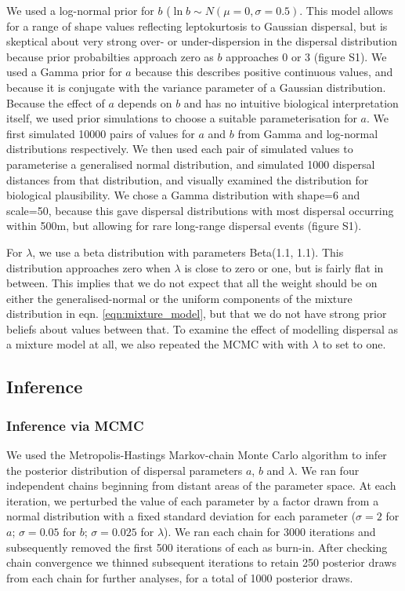 \documentclass[10pt, a4paper, twocolumn]{article} %
\begin{document}
We used a log-normal prior for $b$ ($\ln b \sim N(\mu=0, \sigma = 0.5)$.
This model allows for a range of shape values reflecting leptokurtosis to Gaussian dispersal, but is skeptical about very strong over- or under-dispersion in the dispersal distribution because prior probabilties approach zero as $b$ approaches 0 or 3 (figure S1).
We used a Gamma prior for $a$ because this describes positive continuous values, and because it is conjugate with the variance parameter of a Gaussian distribution.
Because the effect of $a$ depends on $b$ and has no intuitive biological interpretation itself, we used prior simulations to choose a suitable parameterisation for $a$. We first simulated 10000 pairs of values for $a$ and $b$ from Gamma and log-normal distributions respectively. We then used each pair of simulated values to parameterise a generalised normal distribution, and simulated 1000 dispersal distances from that distribution, and visually examined the distribution for biological plausibility. We chose a Gamma distribution with shape=6 and scale=50, because this gave dispersal distributions with most dispersal occurring within 500m, but allowing for rare long-range dispersal events (figure S1).

For $\lambda$, we use a beta distribution with parameters Beta(1.1, 1.1).
This distribution approaches zero when $\lambda$ is close to zero or one, but is fairly flat in between.
This implies that we do not expect that all the weight should be on either the generalised-normal or the uniform components of the mixture distribution in eqn. \ref{eqn:mixture_model}, but that we do not have strong prior beliefs about values between that.
To examine the effect of modelling dispersal as a mixture model at all, we also repeated the MCMC with with $\lambda$ to set to one.

\subsection{Inference}

\subsubsection{Inference via MCMC}

We used the Metropolis-Hastings Markov-chain Monte Carlo algorithm to infer the posterior distribution of dispersal parameters $a$, $b$ and $\lambda$.
We ran four independent chains beginning from distant areas of the parameter space.
At each iteration, we perturbed the value of each parameter by a factor drawn from a normal distribution with a fixed standard deviation for each parameter ($\sigma= 2$ for $a$; $\sigma= 0.05$ for $b$; $\sigma= 0.025$ for $\lambda$).
We ran each chain for 3000 iterations and subsequently removed the first 500 iterations of each as burn-in.
After checking chain convergence we thinned subsequent iterations to retain 250 posterior draws from each chain for further analyses, for a total of 1000 posterior draws.
\end{document}
